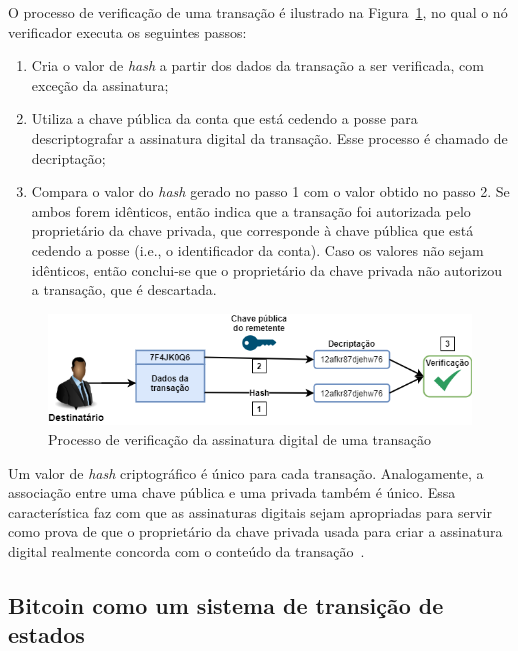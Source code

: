 O processo de verificação de uma transação é ilustrado na Figura~\ref{fig:verifica-assinatura-digital}, no qual o nó verificador executa os seguintes passos:
\begin{enumerate}
    \item Cria o valor de \textit{hash} a partir dos dados da transação a ser verificada, com exceção da assinatura;
    \item Utiliza a chave pública da conta que está cedendo a posse para descriptografar a assinatura digital da transação. Esse processo é chamado de decriptação;
    \item Compara o valor do \textit{hash} gerado no passo 1 com o valor obtido no passo 2. Se ambos forem idênticos, então indica que a transação foi autorizada pelo proprietário da chave privada, que corresponde à chave pública que está cedendo a posse (i.e., o identificador da conta). Caso os valores não sejam idênticos, então conclui-se que o proprietário da chave privada não autorizou a transação, que é descartada. 
\end{enumerate}

\begin{figure}[htb]
 \caption{Processo de verificação da assinatura digital de uma transação}
 \label{fig:verifica-assinatura-digital}
 \centering
 \includegraphics[scale=0.5]{figuras/verifica_assinatura_digital.png}
\end{figure}

Um valor de \textit{hash} criptográfico é único para cada transação. Analogamente, a associação entre uma chave pública e uma privada também é único. Essa característica faz com que as assinaturas digitais sejam apropriadas para servir como prova de que o proprietário da chave privada usada para criar a assinatura digital realmente concorda com o conteúdo da transação~\cite{overview-blockchainbasic2018drescher}.

\subsection{Bitcoin como um sistema de transição de estados} \label{tex:fund:blockchain:transition_system}

